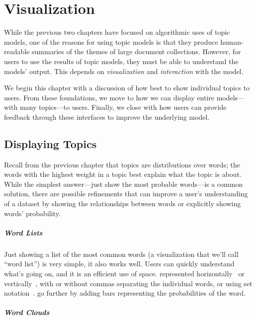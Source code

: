 \chapter{Visualization}
\label{ch:viz}

While the previous two chapters have focused on algorithmic uses of topic
models, one of the reasons for using topic models is that they produce
human-readable summaries of the themes of large document collections.  However,
for users to use the results of topic models, they must be able to understand
the models' output.  This depends on \emph{visualization} and \emph{interaction}
with the model.

We begin this chapter with a discussion of how best to show individual topics to
users.  From these foundations, we move to how we can display entire
models---with many topics---to users.  Finally, we close with how users can
provide feedback through these interfaces to improve the underlying model.

\section{Displaying Topics}
\label{sec:display}

Recall from the previous chapter that topics are distributions over words; the
words with the highest weight in a topic best explain what the topic is about.
While the simplest answer---just show the most probable words---is a common
solution, there are possible refinements that can improve a user's understanding
of a dataset by showing the relationships between words or explicitly showing
words' probability.

\paragraph{Word Lists}

Just showing a list of the most common words (a
visualization that we'll call ``word list'') is very simple, it also works well.
Users can quickly understand what's going on, and it is an efficient use of
space.  represented horizontally~\cite{gardner2010topic,smith2015visual} or
vertically~\cite{eisenstein2012topicviz,chaney2012visualizing}, with or without
commas separating the individual words, or using set
notation~\cite{chaney2012visualizing}.  \citet{smith2015visual} go further by
adding bars representing the probabilities of the word.

\paragraph{Word Clouds}

